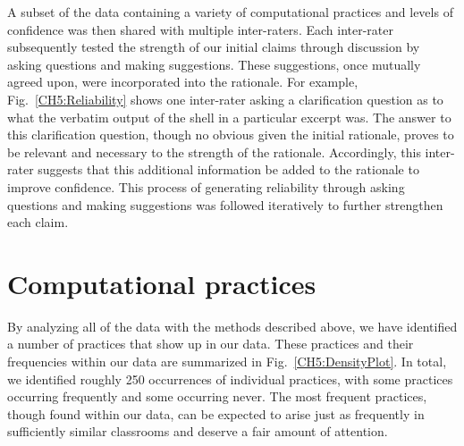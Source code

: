 \documentclass{msuphddissertation}
\begin{document}
\begin{doublespace}
A subset of the data containing a variety of computational practices and levels of confidence was then shared with multiple inter-raters.  Each inter-rater subsequently tested the strength of our initial claims through discussion by asking questions and making suggestions.  These suggestions, once mutually agreed upon, were incorporated into the rationale.  For example, Fig.~\ref{CH5:Reliability} shows one inter-rater asking a clarification question as to what the verbatim output of the shell in a particular excerpt was.  The answer to this clarification question, though no obvious given the initial rationale, proves to be relevant and necessary to the strength of the rationale.  Accordingly, this inter-rater suggests that this additional information be added to the rationale to improve confidence.  This process of generating reliability through asking questions and making suggestions was followed iteratively to further strengthen each claim.

\section{Computational practices}\label{CH5:Practices}

By analyzing all of the data with the methods described above, we have identified a number of practices that show up in our data.  These practices and their frequencies within our data are summarized in Fig.~\ref{CH5:DensityPlot}.  In total, we identified roughly 250 occurrences of individual practices, with some practices occurring frequently and some occurring never.  The most frequent practices, though found within our data, can be expected to arise just as frequently in sufficiently similar classrooms and deserve a fair amount of attention.


\end{doublespace}
\end{document}
